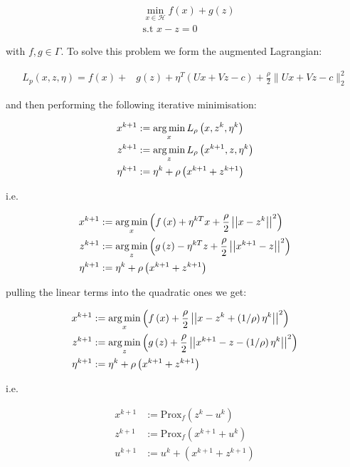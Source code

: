 \begin{align}
&\min_{x \in \mathcal{H}} f\left(x\right) + g\left(z\right)\\
&\text{s.t } x - z = 0
\end{align}

with \(f, g \in \Gamma\). To solve this problem we form the augmented Lagrangian: 

\begin{align*}
L_p\left(x, z, \eta\right) = f\left( x\right) +& g\left(z\right)+\eta^T\left(Ux+Vz-c\right) + \frac{\rho}{2}\|Ux+Vz-c\|_2^2
\end{align*}

and then performing the following iterative minimisation:

\begin{align}
x^{k+1} &:= \operatorname*{arg\,min}_{x} L_\rho\left(x,z^k,\eta^k\right)\\
z^{k+1} &:= \operatorname*{arg\,min}_{z} L_\rho\left(x^{k+1},z,\eta^k\right)\\
\eta^{k+1} &:= \eta^{k} + \rho \left(x^{k+1} + z^{k+1}\right)
\end{align}

i.e. 

\begin{align}
x^{k+1} &:= \operatorname*{arg\,min}_{x} \left( f\left(x\right) + \eta^{kT}x + \frac{\rho}{2}\left|\left|x - z^k\right|\right|^2 \right) \\
z^{k+1} &:= \operatorname*{arg\,min}_{z} \left( g\left(z\right) - \eta^{kT}z + \frac{\rho}{2}\left|\left|x^{k+1} - z\right|\right|^2 \right)\\
\eta^{k+1} &:= \eta^{k} + \rho \left(x^{k+1} + z^{k+1}\right)
\end{align}

pulling the linear terms into the quadratic ones we get:

\begin{align}
x^{k+1} &:= \operatorname*{arg\,min}_{x} \left( f\left(x\right) +  \frac{\rho}{2}\left|\left|x - z^k + \left(1/\rho\right)\eta^k\right|\right|^2 \right) \\
z^{k+1} &:= \operatorname*{arg\,min}_{z} \left( g\left(z\right) +  \frac{\rho}{2}\left|\left|x^{k+1} - z - \left(1/\rho\right)\eta^k\right|\right|^2 \right)\\
\eta^{k+1} &:= \eta^{k} + \rho \left(x^{k+1} + z^{k+1}\right)
\end{align}

i.e.

\begin{align}
x^{k+1} &:= \mathrm{Prox}_f \left( z^k - u^k\right)\\
z^{k+1} &:= \mathrm{Prox}_f \left(x^{k+1} + u^k\right)  \\
u^{k+1} &:= u^{k} + \left(x^{k+1} + z^{k+1}\right)
\end{align}

